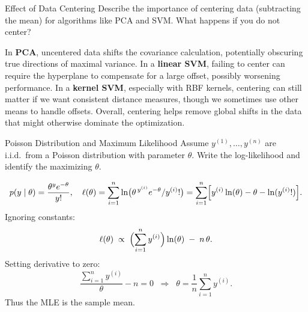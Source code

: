 \documentclass{article}
\begin{document}
\begin{exercise}{Effect of Data Centering}
  Describe the importance of centering data (subtracting the mean) for algorithms like PCA and SVM. What happens if you do not center?

  \begin{solution}
    In \textbf{PCA}, uncentered data shifts the covariance calculation, potentially obscuring true directions of maximal variance.  
    In a \textbf{linear SVM}, failing to center can require the hyperplane to compensate for a large offset, possibly worsening performance.  
    In a \textbf{kernel SVM}, especially with RBF kernels, centering can still matter if we want consistent distance measures, though we sometimes use other means to handle offsets.  
    Overall, centering helps remove global shifts in the data that might otherwise dominate the optimization.
  \end{solution}
\end{exercise}

\begin{exercise}{Poisson Distribution and Maximum Likelihood}
  Assume $y^{(1)},\dots,y^{(n)}$ are i.i.d.\ from a Poisson distribution with parameter $\theta$. Write the log-likelihood and identify the maximizing $\theta$.

  \begin{solution}
    \[
      p(y \mid \theta) = \frac{\theta^y e^{-\theta}}{y!}, 
      \quad
      \ell(\theta) 
      = \sum_{i=1}^n \ln\bigl(\theta^{\,y^{(i)}} e^{-\theta} / y^{(i)}!\bigr)
      = \sum_{i=1}^n \Bigl[y^{(i)} \ln(\theta) - \theta - \ln(y^{(i)}!)\Bigr].
    \]
    Ignoring constants:
    \[
      \ell(\theta) \;\propto\; 
      \Bigl(\sum_{i=1}^n y^{(i)}\Bigr)\ln(\theta) \;-\; n\,\theta.
    \]
    Setting derivative to zero:
    \[
      \frac{\sum_{i=1}^n y^{(i)}}{\theta} - n = 0
      \;\;\Longrightarrow\;\;
      \theta = \frac{1}{n}\sum_{i=1}^n y^{(i)}.
    \]
    Thus the MLE is the sample mean.
  \end{solution}
\end{exercise}




\end{document}
